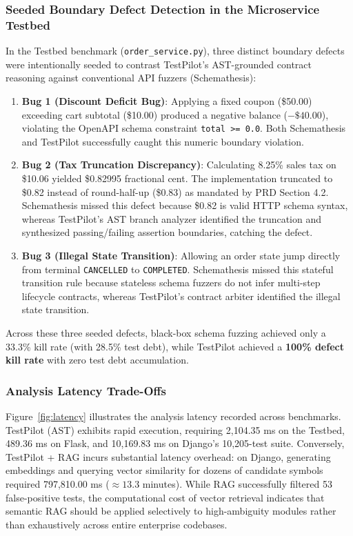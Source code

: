 \documentclass[12pt,onecolumn,draftclsnofoot]{IEEEtran}
\begin{document}
\subsubsection{Seeded Boundary Defect Detection in the Microservice Testbed}
In the Testbed benchmark (\texttt{order\_service.py}), three distinct boundary defects were intentionally seeded to contrast TestPilot's AST-grounded contract reasoning against conventional API fuzzers (Schemathesis):
\begin{enumerate}
    \item \textbf{Bug 1 (Discount Deficit Bug)}: Applying a fixed coupon (\$50.00) exceeding cart subtotal (\$10.00) produced a negative balance ($-\$40.00$), violating the OpenAPI schema constraint \texttt{total >= 0.0}. Both Schemathesis and TestPilot successfully caught this numeric boundary violation.
    \item \textbf{Bug 2 (Tax Truncation Discrepancy)}: Calculating 8.25\% sales tax on \$10.06 yielded \$0.82995 fractional cent. The implementation truncated to \$0.82 instead of round-half-up (\$0.83) as mandated by PRD Section 4.2. Schemathesis missed this defect because \$0.82 is valid HTTP schema syntax, whereas TestPilot's AST branch analyzer identified the truncation and synthesized passing/failing assertion boundaries, catching the defect.
    \item \textbf{Bug 3 (Illegal State Transition)}: Allowing an order state jump directly from terminal \texttt{CANCELLED} to \texttt{COMPLETED}. Schemathesis missed this stateful transition rule because stateless schema fuzzers do not infer multi-step lifecycle contracts, whereas TestPilot's contract arbiter identified the illegal state transition.
\end{enumerate}
Across these three seeded defects, black-box schema fuzzing achieved only a 33.3\% kill rate (with 28.5\% test debt), while TestPilot achieved a \textbf{100\% defect kill rate} with zero test debt accumulation.

\subsubsection{Analysis Latency Trade-Offs}
Figure~\ref{fig:latency} illustrates the analysis latency recorded across benchmarks. TestPilot (AST) exhibits rapid execution, requiring 2,104.35 ms on the Testbed, 489.36 ms on Flask, and 10,169.83 ms on Django's 10,205-test suite. Conversely, TestPilot + RAG incurs substantial latency overhead: on Django, generating embeddings and querying vector similarity for dozens of candidate symbols required 797,810.00 ms ($\approx 13.3$ minutes). While RAG successfully filtered 53 false-positive tests, the computational cost of vector retrieval indicates that semantic RAG should be applied selectively to high-ambiguity modules rather than exhaustively across entire enterprise codebases.
\end{document}
